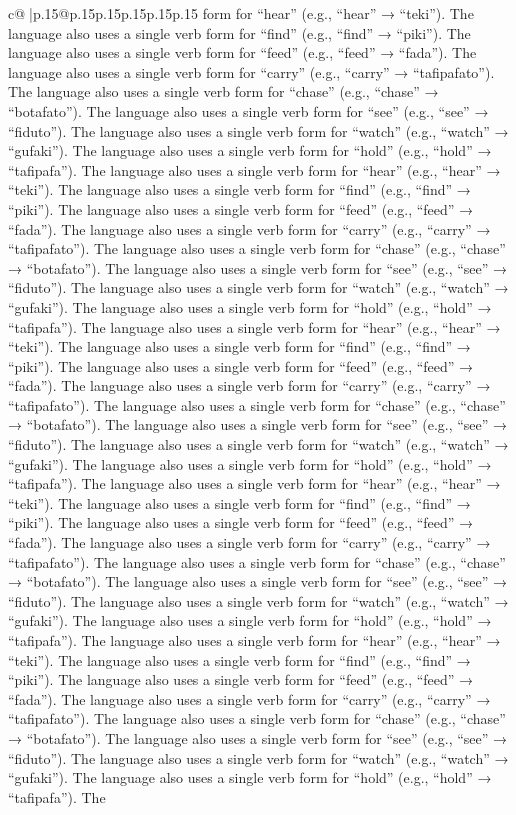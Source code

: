 \documentclass{article}
\begin{document}
{\begin{supertabular}{c@{$\;$}|p{.15\linewidth}@{}p{.15\linewidth}p{.15\linewidth}p{.15\linewidth}p{.15\linewidth}p{.15\linewidth}}
{{{form for “hear” (e.g., “hear” → “teki”). The language also uses a single verb form for “find” (e.g., “find” → “piki”). The language also uses a single verb form for “feed” (e.g., “feed” → “fada”). The language also uses a single verb form for “carry” (e.g., “carry” → “tafipafato”). The language also uses a single verb form for “chase” (e.g., “chase” → “botafato”). The language also uses a single verb form for “see” (e.g., “see” → “fiduto”). The language also uses a single verb form for “watch” (e.g., “watch” → “gufaki”). The language also uses a single verb form for “hold” (e.g., “hold” → “tafipafa”). The language also uses a single verb form for “hear” (e.g., “hear” → “teki”). The language also uses a single verb form for “find” (e.g., “find” → “piki”). The language also uses a single verb form for “feed” (e.g., “feed” → “fada”). The language also uses a single verb form for “carry” (e.g., “carry” → “tafipafato”). The language also uses a single verb form for “chase” (e.g., “chase” → “botafato”). The language also uses a single verb form for “see” (e.g., “see” → “fiduto”). The language also uses a single verb form for “watch” (e.g., “watch” → “gufaki”). The language also uses a single verb form for “hold” (e.g., “hold” → “tafipafa”). The language also uses a single verb form for “hear” (e.g., “hear” → “teki”). The language also uses a single verb form for “find” (e.g., “find” → “piki”). The language also uses a single verb form for “feed” (e.g., “feed” → “fada”). The language also uses a single verb form for “carry” (e.g., “carry” → “tafipafato”). The language also uses a single verb form for “chase” (e.g., “chase” → “botafato”). The language also uses a single verb form for “see” (e.g., “see” → “fiduto”). The language also uses a single verb form for “watch” (e.g., “watch” → “gufaki”). The language also uses a single verb form for “hold” (e.g., “hold” → “tafipafa”). The language also uses a single verb form for “hear” (e.g., “hear” → “teki”). The language also uses a single verb form for “find” (e.g., “find” → “piki”). The language also uses a single verb form for “feed” (e.g., “feed” → “fada”). The language also uses a single verb form for “carry” (e.g., “carry” → “tafipafato”). The language also uses a single verb form for “chase” (e.g., “chase” → “botafato”). The language also uses a single verb form for “see” (e.g., “see” → “fiduto”). The language also uses a single verb form for “watch” (e.g., “watch” → “gufaki”). The language also uses a single verb form for “hold” (e.g., “hold” → “tafipafa”). The language also uses a single verb form for “hear” (e.g., “hear” → “teki”). The language also uses a single verb form for “find” (e.g., “find” → “piki”). The language also uses a single verb form for “feed” (e.g., “feed” → “fada”). The language also uses a single verb form for “carry” (e.g., “carry” → “tafipafato”). The language also uses a single verb form for “chase” (e.g., “chase” → “botafato”). The language also uses a single verb form for “see” (e.g., “see” → “fiduto”). The language also uses a single verb form for “watch” (e.g., “watch” → “gufaki”). The language also uses a single verb form for “hold” (e.g., “hold” → “tafipafa”). The }}}
\end{supertabular}}
\end{document}
